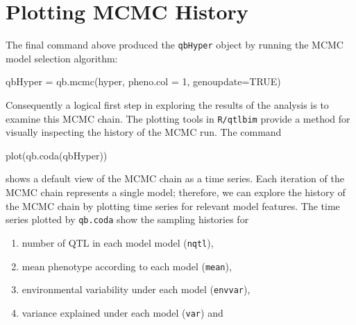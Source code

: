 \documentclass{article}
\begin{document}
\section{Plotting MCMC History}
The final command above produced the \texttt{qbHyper} object by running the MCMC 
model selection algorithm:
\begin{Schunk}
\begin{Sinput}
qbHyper = qb.mcmc(hyper, pheno.col = 1, genoupdate=TRUE)
\end{Sinput}
\end{Schunk}
  Consequently a logical first step in exploring the results
of the analysis is to examine this MCMC chain.  The plotting tools in 
\texttt{R/qtlbim} provide a method for visually inspecting the history of the 
MCMC run.   The command
\begin{Schunk}
\begin{Sinput}
plot(qb.coda(qbHyper))
\end{Sinput}
\end{Schunk}
shows a default view of the MCMC chain as a time series. Each iteration of 
the MCMC chain represents a single model; therefore, we can explore the 
history of the MCMC chain by plotting time series for relevant model features.  
The time series plotted by  \texttt{qb.coda} show the sampling histories for
\begin{enumerate}
\item number of QTL in each model model (\texttt{nqtl}),
\item mean phenotype according to each model (\texttt{mean}),
\item environmental variability under each model (\texttt{envvar}),
\item variance explained under each model (\texttt{var}) and
\end{enumerate}
\end{document}
